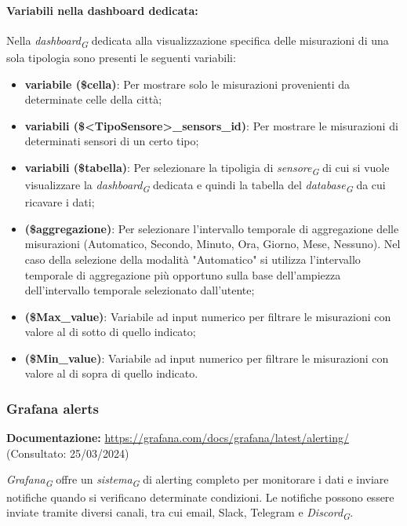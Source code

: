 \paragraph*{Variabili nella dashboard dedicata:} \label{sec:var_dedicate}
Nella \textit{dashboard}\textsubscript{\textit{G}} dedicata alla visualizzazione specifica delle misurazioni di una sola tipologia sono presenti le seguenti variabili:
\begin{itemize}
    \item \textbf{variabile (\$cella)}: Per mostrare solo le misurazioni provenienti da determinate celle della città;
    \item \textbf{variabili (\$<TipoSensore>\_sensors\_id)}: Per mostrare le misurazioni di determinati sensori di un certo tipo;
    \item \textbf{variabili (\$tabella)}: Per selezionare la tipoligia di \textit{sensore}\textsubscript{\textit{G}} di cui si vuole visualizzare la \textit{dashboard}\textsubscript{\textit{G}} dedicata e quindi la tabella del \textit{database}\textsubscript{\textit{G}} da cui ricavare i dati;
    \item \textbf{(\$aggregazione)}: Per selezionare l'intervallo temporale di aggregazione delle misurazioni
    (Automatico, Secondo, Minuto, Ora, Giorno, Mese, Nessuno).
    Nel caso della selezione della modalità "Automatico" si utilizza l'intervallo temporale di aggregazione più opportuno sulla base dell'ampiezza dell'intervallo temporale selezionato dall'utente;
    \item \textbf{(\$Max\_value)}: Variabile ad input numerico per filtrare le misurazioni con valore al di sotto di quello indicato;
    \item \textbf{(\$Min\_value)}: Variabile ad input numerico per filtrare le misurazioni con valore al di sopra di quello indicato.
\end{itemize}



\subsubsection{Grafana alerts}
\textbf{Documentazione:}
\url{https://grafana.com/docs/grafana/latest/alerting/} (Consultato: 25/03/2024)

\textit{Grafana}\textsubscript{\textit{G}} offre un \textit{sistema}\textsubscript{\textit{G}} di alerting completo per monitorare i dati e inviare notifiche quando si verificano determinate condizioni. Le notifiche possono essere inviate tramite diversi canali, tra cui email, Slack, Telegram e \textit{Discord}\textsubscript{\textit{G}}.

